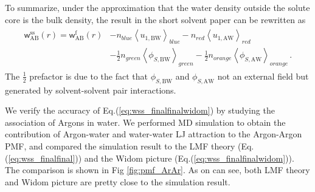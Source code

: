 \documentclass[9pt]{article}
\newcommand{\A}{\mathrm{A}}
\newcommand{\W}{\mathrm{W}}
\newcommand{\B}{\mathrm{B}}
\newcommand{\f}{\mathrm{f}}
\newcommand{\sss}{\mathrm{ss}}
\newcommand{\w}{\mathsf{w}}
\begin{document}
To summarize, under the approximation that the water density outside the solute core is the bulk density, the result in the short solvent paper can be rewritten as
 \begin{align}
\begin{split}
 \w_{\A\B}^{\sss}(r) =  \w_{\A\B}^{\f}(r)   & - n_{blue} \left\langle u_{1,\B\W} \right\rangle_{blue} - n_{red} \left\langle u_{1,\A\W} \right\rangle_{red} \\
  & - \frac{1}{2} n_{green}  \left\langle \phi_{S,\B\W} \right\rangle_{green} - \frac{1}{2} n_{orange}  \left\langle \phi_{S,\A\W} \right\rangle_{orange}  \,.
\end{split}
\label{eq:wss_finalfinalwidom}
\end{align}
The $\frac{1}{2}$ prefactor is due to the fact that $\phi_{S,\B\W} $ and $\phi_{S,\A\W}$ not an external field but  generated by solvent-solvent pair interactions. 

We verify the accuracy of Eq.(\ref{eq:wss_finalfinalwidom}) by studying the association of Argons in water. We performed MD simulation to obtain the contribution of Argon-water and water-water LJ attraction to the Argon-Argon PMF, and compared the simulation result to the LMF theory (Eq.(\ref{eq:wss_finalfinal})) and the Widom picture (Eq.(\ref{eq:wss_finalfinalwidom})).
The comparison is shown in Fig \ref{fig:pmf_ArAr}. As on can see, both LMF theory and Widom picture are pretty close to the simulation result. 
\end{document}
